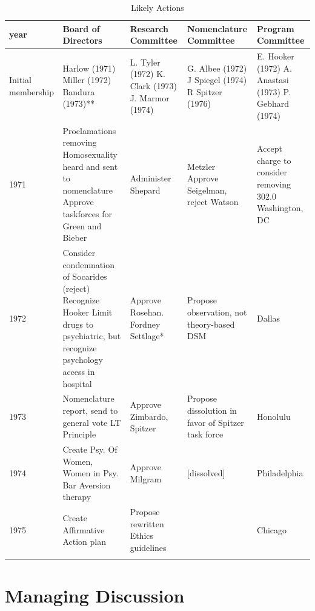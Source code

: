  \begin{longtable}[!t]{ | p{1cm} | p{2cm} | p{1cm} | p{10cm} | p{2cm} | }
\hline
year&
Board of Directors&
Research Committee&
Nomenclature Committee&
Program Committee\\ \hline
Initial membership&
Harlow (1971)\newline
Miller (1972)\newline
Bandura (1973)\newline
[A: Milgram]*\newline
[B: Albee]*&
L. Tyler (1972)\newline
K. Clark (1973)\newline
J. Marmor (1974)&
G. Albee (1972)\newline
J Spiegel (1974)\newline
R Spitzer (1976)&
E. Hooker (1972)\newline
A. Anastasi (1973)\newline
P. Gebhard (1974)\\

1971&
Proclamations removing Homosexuality heard and sent to nomenclature\newline
Approve taskforces for Green and Bieber &
Administer Shepard & Metzler\newline
Approve Seigelman, reject Watson&
Accept charge to consider removing 302.0
Washington, DC\\
1972&
Consider condemnation of Socarides (reject)\newline
Recognize Hooker\newline
Limit drugs to psychiatric, but recognize psychology access in hospital&
Approve Rosehan. Fordney Settlage*&
Propose observation, not theory-based DSM&
Dallas\\
1973&
Nomenclature report, send to general vote\newline
LT Principle&
Approve Zimbardo, Spitzer&
Propose dissolution in favor of Spitzer task force&
Honolulu\\
1974&
Create Psy. Of Women, Women in Psy.\newline
Bar Aversion therapy&
Approve Milgram&
[dissolved]&
Philadelphia\\
1975&
Create Affirmative Action plan&
Propose rewritten Ethics guidelines&
 &
Chicago\\
\hline

\caption{Likely Actions}
\label{table: likelyactions}
\end{longtable}

\section{Managing Discussion}
\label{managingdiscussion}

